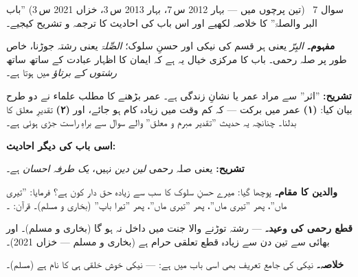 \begin{sawal}{سوال \textenglish{7} \ \textnormal{\small(تین پرچوں میں --- بہار \textenglish{2012} س\,\textenglish{7}، بہار \textenglish{2013} س\,\textenglish{3}، خزاں \textenglish{2021} س\,\textenglish{3})}}
''باب البر والصلۃ'' کا خلاصہ لکھیے اور اس باب کی احادیث کا ترجمہ و تشریح کیجیے۔
\end{sawal}

\begin{hal}
\textbf{مفہوم۔} \emph{البِرّ} یعنی ہر قسم کی نیکی اور حسنِ سلوک؛ \emph{الصِّلۃ}
یعنی رشتہ جوڑنا، خاص طور پر صلہ رحمی۔ باب کا مرکزی خیال یہ ہے کہ ایمان کا اظہار
عبادت کے ساتھ ساتھ \emph{رشتوں کے برتاؤ} میں ہوتا ہے۔

\medskip
\begin{nukta}

\smallskip
\textbf{تشریح:} ''اثر'' سے مراد عمر یا نشانِ زندگی ہے۔ عمر بڑھنے کا مطلب
علماء نے دو طرح بیان کیا: \textbf{(۱)} عمر میں برکت --- کہ کم وقت میں زیادہ کام
ہو جائے، اور \textbf{(۲)} تقدیرِ معلق کا بدلنا۔ چنانچہ یہ حدیث ''تقدیر مبرم و
معلق'' والے سوال سے براہِ راست جڑی ہوئی ہے۔
\end{nukta}

\medskip
\textbf{اسی باب کی دیگر احادیث:}

\textbf{تشریح:} یعنی صلہ رحمی \emph{لین دین} نہیں، \emph{یک طرفہ احسان} ہے۔

\medskip
\textbf{والدین کا مقام۔} پوچھا گیا: میرے حسنِ سلوک کا سب سے زیادہ حق دار کون
ہے؟ فرمایا: ''تیری ماں''، پھر ''تیری ماں''، پھر ''تیری ماں''، پھر ''تیرا باپ''
(بخاری و مسلم)۔ قرآن: ۔

\medskip
\textbf{قطع رحمی کی وعید۔}  --- رشتہ توڑنے
والا جنت میں داخل نہ ہو گا (بخاری و مسلم)۔ اور بھائی سے تین دن سے زیادہ قطع
تعلقی حرام ہے (بخاری و مسلم --- خزاں \textenglish{2021})۔

\medskip
\textbf{خلاصہ۔} نیکی کی جامع تعریف بھی اسی باب میں ہے:  --- نیکی خوش خلقی ہی کا نام ہے (مسلم)۔
\end{hal}

